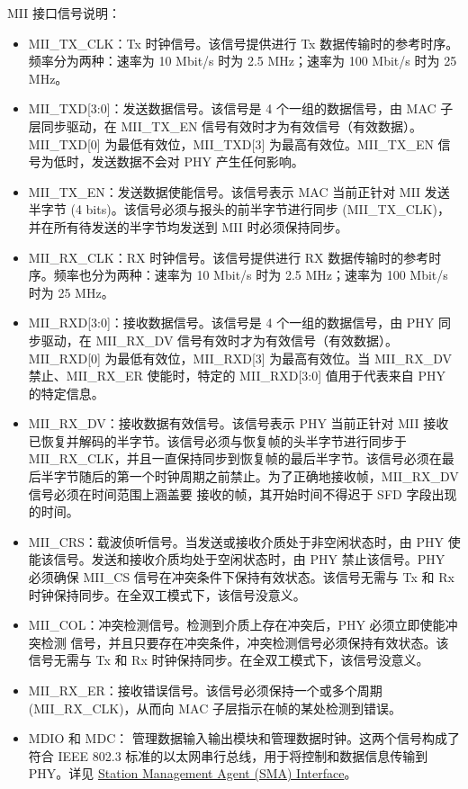 \documentclass[main\_\_CN.tex]{subfiles}
\begin{document}
MII 接口信号说明：
\begin{itemize}
    \item MII\_TX\_CLK：Tx 时钟信号。该信号提供进行 Tx 数据传输时的参考时序。频率分为两种：速率为 10 Mbit/s 时为 2.5 MHz；速率为 100 Mbit/s 时为 25 MHz。
    \item MII\_TXD[3:0]：发送数据信号。该信号是 4 个一组的数据信号，由 MAC 子层同步驱动，在 MII\_TX\_EN 信号有效时才为有效信号（有效数据）。MII\_TXD[0] 为最低有效位，MII\_TXD[3] 为最高有效位。MII\_TX\_EN 信号为低时，发送数据不会对 PHY 产生任何影响。
    \item MII\_TX\_EN：发送数据使能信号。该信号表示 MAC 当前正针对 MII 发送半字节 (4 bits)。该信号必须与报头的前半字节进行同步 (MII\_TX\_CLK)，并在所有待发送的半字节均发送到 MII 时必须保持同步。
    \item MII\_RX\_CLK：RX 时钟信号。该信号提供进行 RX 数据传输时的参考时序。频率也分为两种：速率为 10 Mbit/s 时为 2.5 MHz；速率为 100 Mbit/s 时为 25 MHz。
    \item MII\_RXD[3:0]：接收数据信号。该信号是 4 个一组的数据信号，由 PHY 同步驱动，在 MII\_RX\_DV 信号有效时才为有效信号（有效数据）。MII\_RXD[0] 为最低有效位，MII\_RXD[3] 为最高有效位。当 MII\_RX\_DV 禁止、MII\_RX\_ER 使能时，特定的 MII\_RXD[3:0] 值用于代表来自 PHY 的特定信息。
    \item MII\_RX\_DV：接收数据有效信号。该信号表示 PHY 当前正针对 MII 接收已恢复并解码的半字节。该信号必须与恢复帧的头半字节进行同步于 MII\_RX\_CLK，并且一直保持同步到恢复帧的最后半字节。该信号必须在最后半字节随后的第一个时钟周期之前禁止。为了正确地接收帧，MII\_RX\_DV 信号必须在时间范围上涵盖要 接收的帧，其开始时间不得迟于 SFD 字段出现的时间。
    \item MII\_CRS：载波侦听信号。当发送或接收介质处于非空闲状态时，由 PHY 使能该信号。发送和接收介质均处于空闲状态时，由 PHY 禁止该信号。PHY 必须确保 MII\_CS 信号在冲突条件下保持有效状态。该信号无需与 Tx 和 Rx 时钟保持同步。在全双工模式下，该信号没意义。
    \item MII\_COL：冲突检测信号。检测到介质上存在冲突后，PHY 必须立即使能冲突检测 信号，并且只要存在冲突条件，冲突检测信号必须保持有效状态。该信号无需与 Tx 和 Rx 时钟保持同步。在全双工模式下，该信号没意义。
    \item MII\_RX\_ER：接收错误信号。该信号必须保持一个或多个周期 (MII\_RX\_CLK)，从而向 MAC 子层指示在帧的某处检测到错误。
    \item MDIO 和 MDC： 管理数据输入输出模块和管理数据时钟。这两个信号构成了符合 IEEE 802.3 标准的以太网串行总线，用于将控制和数据信息传输到PHY。详见 \hyperref[section:Station Management Agent (SMA) Interface]{Station Management Agent (SMA) Interface}。
\end{itemize}
\end{document}
